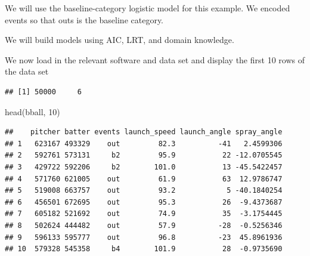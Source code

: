 \documentclass[
  ignorenonframetext,
]{beamer}
\newenvironment{Shaded}{\begin{snugshade}}{\end{snugshade}}
\newcommand{\CommentTok}[1]{\textcolor[rgb]{0.56,0.35,0.01}{\textit{#1}}}
\newcommand{\DecValTok}[1]{\textcolor[rgb]{0.00,0.00,0.81}{#1}}
\newcommand{\FunctionTok}[1]{\textcolor[rgb]{0.00,0.00,0.00}{#1}}
\newcommand{\NormalTok}[1]{#1}
\newcommand{\OtherTok}[1]{\textcolor[rgb]{0.56,0.35,0.01}{#1}}
\newcommand{\SpecialCharTok}[1]{\textcolor[rgb]{0.00,0.00,0.00}{#1}}
\newcommand{\StringTok}[1]{\textcolor[rgb]{0.31,0.60,0.02}{#1}}
\begin{document}
\begin{frame}{}
\protect\hypertarget{section-3}{}
We will use the baseline-category logistic model for this example. We
encoded events so that outs is the baseline category.

\vspace{12pt}

We will build models using AIC, LRT, and domain knowledge.
\end{frame}

\begin{frame}[fragile]{}
\protect\hypertarget{section-4}{}
We now load in the relevant software and data set and display the first
10 rows of the data set

\vspace{12pt}
\tiny

\begin{Shaded}
\end{Shaded}

\begin{verbatim}
## [1] 50000     6
\end{verbatim}

\begin{Shaded}
\begin{Highlighting}[]
\FunctionTok{head}\NormalTok{(bball, }\DecValTok{10}\NormalTok{)}
\end{Highlighting}
\end{Shaded}

\begin{verbatim}
##    pitcher batter events launch_speed launch_angle spray_angle
## 1   623167 493329    out         82.3          -41   2.4599306
## 2   592761 573131     b2         95.9           22 -12.0705545
## 3   429722 592206     b2        101.0           13 -45.5422457
## 4   571760 621005    out         61.9           63  12.9786747
## 5   519008 663757    out         93.2            5 -40.1840254
## 6   456501 672695    out         95.3           26  -9.4373687
## 7   605182 521692    out         74.9           35  -3.1754445
## 8   502624 444482    out         57.9          -28  -0.5256346
## 9   596133 595777    out         96.8          -23  45.8961936
## 10  579328 545358     b4        101.9           28  -0.9735690
\end{verbatim}
\end{frame}
\end{document}
